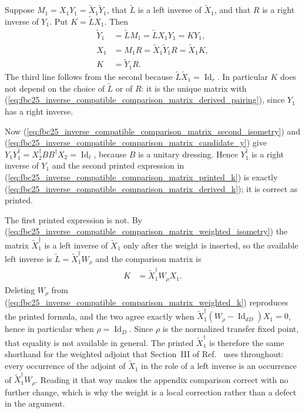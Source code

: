 \documentclass{article}
\begin{document}
Suppose $M_1=X_1Y_1=\tilde X_1\tilde Y_1$, that $\tilde L$ is a left inverse of
$\tilde X_1$, and that $R$ is a right inverse of $Y_1$. Put $K=\tilde LX_1$.
Then
\begin{align}
    \tilde Y_1
     & =\tilde LM_1
    =\tilde LX_1Y_1
    =KY_1,
    \label{eq:fbc25_inverse_compatible_comparison_matrix_derived_pairing} \\
    X_1
     & =M_1R
    =\tilde X_1\tilde Y_1R
    =\tilde X_1K,
    \label{eq:fbc25_inverse_compatible_comparison_matrix_derived_factor} \\
    K
     & =\tilde Y_1R.
    \label{eq:fbc25_inverse_compatible_comparison_matrix_derived_k}
\end{align}
The third line follows from the second because $\tilde L\tilde X_1
=\operatorname{Id}_r$. In particular $K$ does not depend on the choice of
$\tilde L$ or of $R$: it is the unique matrix with
(\ref{eq:fbc25_inverse_compatible_comparison_matrix_derived_pairing}), since
$Y_1$ has a right inverse.

Now
(\ref{eq:fbc25_inverse_compatible_comparison_matrix_second_isometry}) and
(\ref{eq:fbc25_inverse_compatible_comparison_matrix_candidate_y}) give
$Y_1Y_1^\dagger=X_2^\dagger BB^\dagger X_2=\operatorname{Id}_\ell$, because $B$
is a unitary dressing. Hence $Y_1^\dagger$ is a right inverse of $Y_1$ and the
second printed expression in
(\ref{eq:fbc25_inverse_compatible_comparison_matrix_printed_k}) is exactly
(\ref{eq:fbc25_inverse_compatible_comparison_matrix_derived_k}); it is correct
as printed.

The first printed expression is not. By
(\ref{eq:fbc25_inverse_compatible_comparison_matrix_weighted_isometry}) the
matrix $\tilde X_1^\dagger$ is a left inverse of $\tilde X_1$ only after the
weight is inserted, so the available left inverse is
$\tilde L=\tilde X_1^\dagger W_\rho$ and the comparison matrix is
\begin{align}
    K
     & =\tilde X_1^\dagger W_\rho X_1.
    \label{eq:fbc25_inverse_compatible_comparison_matrix_weighted_k}
\end{align}
Deleting $W_\rho$ from
(\ref{eq:fbc25_inverse_compatible_comparison_matrix_weighted_k}) reproduces the
printed formula, and the two agree exactly when
$\tilde X_1^\dagger(W_\rho-\operatorname{Id}_{dD})X_1=0$, hence in particular
when $\rho=\operatorname{Id}_D$. Since $\rho$ is the normalized transfer fixed
point, that equality is not available in general. The printed
$\tilde X_1^\dagger$ is therefore the same shorthand for the weighted adjoint
that Section~III of Ref.~\cite{Cirac2017MPU} uses throughout: every occurrence
of the adjoint of $\tilde X_1$ in the role of a left inverse is an occurrence
of $\tilde X_1^\dagger W_\rho$. Reading it that way makes the appendix
comparison correct with no further change, which is why the weight is a local
correction rather than a defect in the argument.
\end{document}
